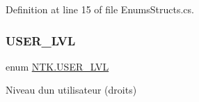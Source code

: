Definition at line 15 of file Enums\+Structs.\+cs.

\mbox{\label{namespace_n_t_k_a1a2136a0cde3a719c9188a4d515e9f1b}} 
\subsubsection{\texorpdfstring{USER\_LVL}{USER\_LVL}}
{\footnotesize\ttfamily enum \mbox{\hyperlink{namespace_n_t_k_a1a2136a0cde3a719c9188a4d515e9f1b}{N\+T\+K.\+U\+S\+E\+R\+\_\+\+L\+VL}}\hspace{0.3cm}{\ttfamily [strong]}}



Niveau d\textquotesingle{}un utilisateur (droits) 

